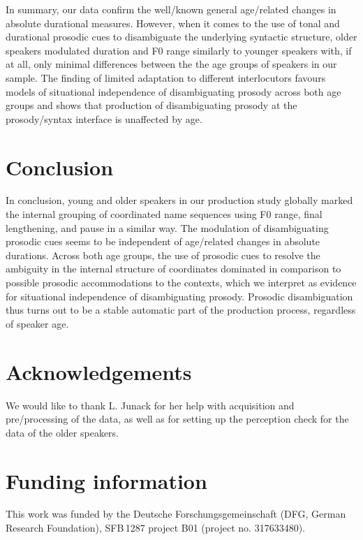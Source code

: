 \documentclass[output=paper]{langscibook}
\begin{document}
In summary, our data confirm the well\-/known general age\-/related changes in absolute durational measures. However, when it comes to the use of tonal and durational prosodic cues to disambiguate the underlying syntactic structure, older speakers modulated duration and F0 range similarly to younger speakers with, if at all, only minimal differences between the the age groups of speakers in our sample. The finding of limited adaptation to different interlocutors favours models of situational independence of disambiguating prosody across both age groups and shows that production of disambiguating prosody at the prosody\-/syntax interface is unaffected by age.  

\section{Conclusion}
\begin{sloppypar}
In conclusion, young and older speakers in our production study globally marked the internal grouping of coordinated name sequences using F0 range, final lengthening, and pause in a similar way. The modulation of disambiguating prosodic cues seems to be independent of age\-/related changes in absolute durations. Across both age groups, the use of prosodic cues to resolve the ambiguity in the internal structure of coordinates dominated in comparison to possible prosodic accommodations to the contexts, which we interpret as evidence for situational independence of disambiguating prosody. Prosodic disambiguation thus turns out to be a stable automatic part of the production process, regardless of speaker age.
\end{sloppypar}

\section*{Acknowledgements}
We would like to thank L. Junack for her help with acquisition and pre\-/processing of the data, as well as for setting up the perception check for the data of the older speakers. 

\section*{Funding information}
This work was funded by the Deutsche Forschungsgemeinschaft (DFG, German Research Foundation), SFB\,1287 project B01 (project no. 317633480).

\printbibliography[heading=subbibliography,notkeyword=this]
\end{document}
